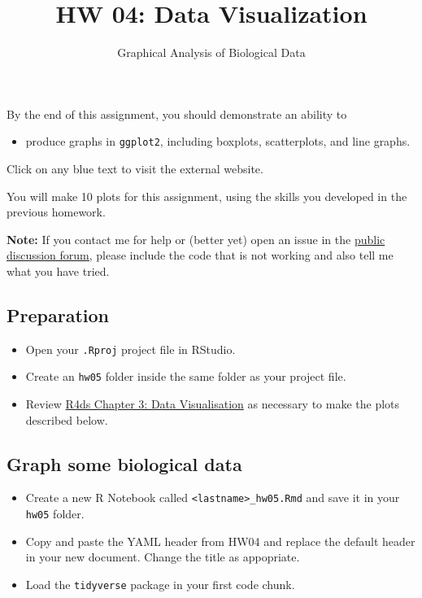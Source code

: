 \documentclass[]{article}
\title{HW 04: Data Visualization}
\subtitle{Graphical Analysis of Biological Data}
\author{}
\date{\vspace{-2.5em}}
\providecommand{\tightlist}{%
  \setlength{\itemsep}{0pt}\setlength{\parskip}{0pt}}
\begin{document}
\maketitle

By the end of this assignment, you should demonstrate an ability to

\begin{itemize}
\tightlist
\item
  produce graphs in \texttt{ggplot2}, including boxplots, scatterplots,
  and line graphs.
\end{itemize}

Click on any blue text to visit the external website.

You will make 10 plots for this assignment, using the skills you
developed in the previous homework.

\textbf{Note:} If you contact me for help or (better yet) open an issue
in the \href{https://github.com/SEMO-GABD/public_discussion}{public
discussion forum,} please include the code that is not working and also
tell me what you have tried.

\hypertarget{preparation}{%
\subsection{Preparation}\label{preparation}}

\begin{itemize}
\item
  Open your \texttt{.Rproj} project file in RStudio.
\item
  Create an \texttt{hw05} folder inside the same folder as your project
  file.
\item
  Review \href{https://r4ds.had.co.nz/data-visualisation.html}{R4ds
  Chapter 3: Data Visualisation} as necessary to make the plots
  described below.
\end{itemize}

\hypertarget{graph-some-biological-data}{%
\subsection{Graph some biological
data}\label{graph-some-biological-data}}

\begin{itemize}
\item
  Create a new R Notebook called
  \texttt{\textless{}lastname\textgreater{}\_hw05.Rmd} and save it in
  your \texttt{hw05} folder.
\item
  Copy and paste the YAML header from HW04 and replace the default
  header in your new document. Change the title as appopriate.
\item
  Load the \texttt{tidyverse} package in your first code chunk.
\end{itemize}
\end{document}
